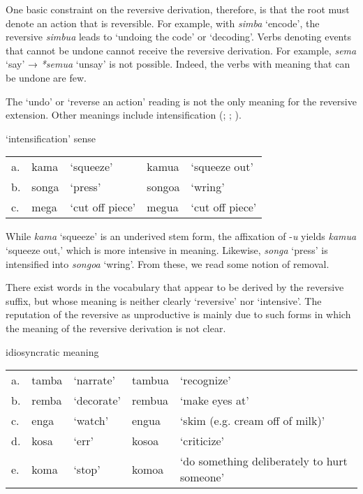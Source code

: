 \documentclass[output=paper]{langsci/langscibook}
\begin{document}
One basic constraint on the reversive derivation, therefore, is that the root must denote an action that is reversible. For example, with \textit{simba} ‘encode’, the reversive \textit{simbua} leads to ‘undoing the code’ or ‘decoding’. Verbs denoting events that cannot be undone cannot receive the reversive derivation. For example, \textit{sema} ‘say’ → \textit{*semua} ‘unsay’ is not possible. Indeed, the verbs with meaning that can be undone are few. 

The ‘undo’ or ‘reverse an action’ reading is not the only meaning for the reversive extension. Other meanings include intensification (\citealt[239]{Ashton1947}; \citealt[90]{Polome1967}; \citealt[78]{Schadeberg2003}).   

\ea\label{ex:ngonyaningowa:8} {`intensification' sense}
\begin{tabularx}{\textwidth}{lllll}
a.\label{ex:ngonyaningowa:8a} & {kama} & {‘squeeze’}& {kamua} & {‘squeeze out’}\\
b.\label{ex:ngonyaningowa:8b} & {songa} & {‘press’} & {songoa} & {‘wring’}\\
c.\label{ex:ngonyaningowa:8c} & {mega} & {‘cut off piece’} & {megua} & {‘cut off piece’}
\end{tabularx}
\z 

While \textit{kama} ‘squeeze’ is an underived stem form, the affixation of -\textit{u} yields \textit{kamua} ‘squeeze out,’ which is more intensive in meaning. Likewise, \textit{songa} ‘press’ is intensified into \textit{songoa }‘wring’. From these, we read some notion of removal. 

There exist words in the vocabulary that appear to be derived by the reversive suffix, but whose meaning is neither clearly ‘reversive’ nor ‘intensive’. The reputation of the reversive as unproductive is mainly due to such forms in which the meaning of the reversive derivation is not clear.

\ea\label{ex:ngonyaningowa:9} {idiosyncratic meaning}
\begin{tabularx}{\textwidth}{lllll}
a.\label{ex:ngonyaningowa:9a} & {tamba} & {‘narrate’} & {tambua} & {‘recognize’}\\
b.\label{ex:ngonyaningowa:9b} & {remba} & {‘decorate’} & {rembua} & {‘make eyes at’}\\
c.\label{ex:ngonyaningowa:9c} & {enga} & {‘watch’} & {engua} & {‘skim (e.g. cream off of milk)’}\\
d.\label{ex:ngonyaningowa:9d} & {kosa} & {‘err’} & {kosoa} & {‘criticize’}\\
e.\label{ex:ngonyaningowa:9e} & {koma} & {‘stop’} & {komoa} & {‘do something deliberately to hurt someone’}
\end{tabularx}
\z 
\end{document}
